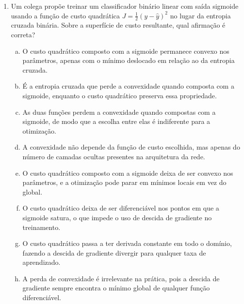 \documentclass{dlproblemset}
\begin{document}
\begin{enumerate}[1)]
    \begin{enumerate}[(a)]
        \item 1-(i); 2-(ii); 3-(iii); 4-(iv)
        \item 1-(iii); 2-(i); 3-(ii); 4-(iv)
        \item 1-(ii); 2-(iii); 3-(i); 4-(iv)
        \item 1-(iii); 2-(ii); 3-(iv); 4-(i)
        \item 1-(i); 2-(iii); 3-(ii); 4-(iv)
        \item 1-(iv); 2-(ii); 3-(i); 4-(iii)
        \item 1-(ii); 2-(i); 3-(iii); 4-(iv)
        \item 1-(iii); 2-(ii); 3-(i); 4-(iv)
    \end{enumerate}

    \item Um colega propõe treinar um classificador binário linear com saída sigmoide usando a função de custo quadrática $J = \tfrac{1}{2}(y - \hat{y})^2$ no lugar da entropia cruzada binária. Sobre a superfície de custo resultante, qual afirmação é correta?
    \begin{enumerate}[(a)]
        \item O custo quadrático composto com a sigmoide permanece convexo nos parâmetros, apenas com o mínimo deslocado em relação ao da entropia cruzada.
        \item É a entropia cruzada que perde a convexidade quando composta com a sigmoide, enquanto o custo quadrático preserva essa propriedade.
        \item As duas funções perdem a convexidade quando compostas com a sigmoide, de modo que a escolha entre elas é indiferente para a otimização.
        \item A convexidade não depende da função de custo escolhida, mas apenas do número de camadas ocultas presentes na arquitetura da rede.
        \item O custo quadrático composto com a sigmoide deixa de ser convexo nos parâmetros, e a otimização pode parar em mínimos locais em vez do global.
        \item O custo quadrático deixa de ser diferenciável nos pontos em que a sigmoide satura, o que impede o uso de descida de gradiente no treinamento.
        \item O custo quadrático passa a ter derivada constante em todo o domínio, fazendo a descida de gradiente divergir para qualquer taxa de aprendizado.
        \item A perda de convexidade é irrelevante na prática, pois a descida de gradiente sempre encontra o mínimo global de qualquer função diferenciável.
    \end{enumerate}


\end{enumerate}
\end{document}
